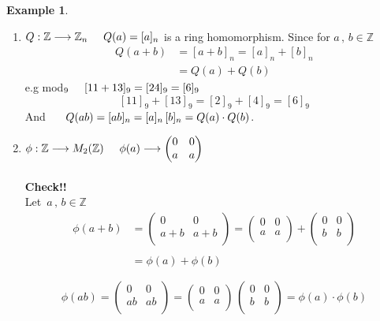 \documentclass[11pt,a4paper]{article}
\theoremstyle{definition}
\newtheorem{exa}[thm]{Example}
\begin{document}
\begin{exa}
\begin{enumerate}
\item $Q : \mathbb{Z} \longrightarrow \mathbb{Z}_n\hspace{0.5cm} Q(a) = [a]_n$ is a ring homomorphism. Since for $a\, , \, b\in \mathbb{Z}\, $
\begin{align*}
Q(a + b) & = [a + b]_n = [a]_n + [b]_n\\
& = Q(a) + Q(b)
\end{align*}
e.g mod$_9\hspace{0.5cm} [ 11 + 13]_9  = [24]_9 = [6]_9$
$$[11]_9 + [13]_9 = [2]_9 + [4]_9 = [6]_9$$
And $\hspace{0.5cm} Q(ab) = [ab]_n = [a]_n\, [b]_n = Q(a)\cdot Q(b)$.\\



\item $\phi :  \mathbb{Z} \longrightarrow M_2(\mathbb{Z})\hspace{0.5cm}  \phi(a) \longrightarrow \begin{pmatrix}
0 & 0\\
a & a\\
\end{pmatrix}$\\\\



\textbf{Check!!}\\
Let $\, a\, , \, b\in \mathbb{Z}\,$
\begin{align*}
\phi (a + b) & = \begin{pmatrix}
0 & 0\\
a + b & a + b\\
\end{pmatrix} = \begin{pmatrix}
0 & 0\\
a & a\\
\end{pmatrix} + \begin{pmatrix}
0 & 0\\
b & b\\
\end{pmatrix}\\\\
& = \phi (a) + \phi (b)
\end{align*}


$$\phi (ab) = \begin{pmatrix}
0 & 0\\
ab & ab\\
\end{pmatrix} = \begin{pmatrix}
0  & 0\\
a & a\\
\end{pmatrix}\, \begin{pmatrix}
0 & 0\\
b & b\\
\end{pmatrix} = \phi (a)\cdot \phi (b)$$



\end{enumerate}
\end{exa}
\end{document}
